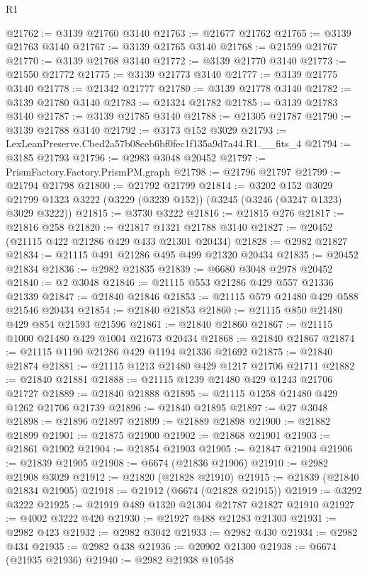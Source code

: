 \begin{lexlean}{R1}
\begin{coremodule}
@21762 := @3139 @21760 @3140
@21763 := @21677 @21762
@21765 := @3139 @21763 @3140
@21767 := @3139 @21765 @3140
@21768 := @21599 @21767
@21770 := @3139 @21768 @3140
@21772 := @3139 @21770 @3140
@21773 := @21550 @21772
@21775 := @3139 @21773 @3140
@21777 := @3139 @21775 @3140
@21778 := @21342 @21777
@21780 := @3139 @21778 @3140
@21782 := @3139 @21780 @3140
@21783 := @21324 @21782
@21785 := @3139 @21783 @3140
@21787 := @3139 @21785 @3140
@21788 := @21305 @21787
@21790 := @3139 @21788 @3140
@21792 := @3173 @152 @3029
@21793 := LexLeanPreserve.Cbed2a57b08ceb6bf0fec1f135a9d7a44.R1.__fits_4
@21794 := @3185 @21793
@21796 := @2983 @3048 @20452
@21797 := PrismFactory.Factory.PrismPM.graph
@21798 := @21796 @21797
@21799 := @21794 @21798
@21800 := @21792 @21799
@21814 := @3202
    @152
    @3029
    @21799
    @1323
    @3222
    (@3229 (@3239 @152))
    (@3245 (@3246 (@3247 @1323) @3029 @3222))
@21815 := @3730 @3222
@21816 := @21815 @276
@21817 := @21816 @258
@21820 := @21817 @1321 @21788 @3140
@21827 := @20452 (@21115 @422 @21286 @429 @433 @21301 @20434)
@21828 := @2982 @21827
@21834 := @21115 @491 @21286 @495 @499 @21320 @20434
@21835 := @20452 @21834
@21836 := @2982 @21835
@21839 := @6680 @3048 @2978 @20452
@21840 := @2 @3048
@21846 := @21115 @553 @21286 @429 @557 @21336 @21339
@21847 := @21840 @21846
@21853 := @21115 @579 @21480 @429 @588 @21546 @20434
@21854 := @21840 @21853
@21860 := @21115 @850 @21480 @429 @854 @21593 @21596
@21861 := @21840 @21860
@21867 := @21115 @1000 @21480 @429 @1004 @21673 @20434
@21868 := @21840 @21867
@21874 := @21115 @1190 @21286 @429 @1194 @21336 @21692
@21875 := @21840 @21874
@21881 := @21115 @1213 @21480 @429 @1217 @21706 @21711
@21882 := @21840 @21881
@21888 := @21115 @1239 @21480 @429 @1243 @21706 @21727
@21889 := @21840 @21888
@21895 := @21115 @1258 @21480 @429 @1262 @21706 @21739
@21896 := @21840 @21895
@21897 := @27 @3048
@21898 := @21896 @21897
@21899 := @21889 @21898
@21900 := @21882 @21899
@21901 := @21875 @21900
@21902 := @21868 @21901
@21903 := @21861 @21902
@21904 := @21854 @21903
@21905 := @21847 @21904
@21906 := @21839 @21905
@21908 := @6674 (@21836 @21906)
@21910 := @2982 @21908 @3029
@21912 := @21820 (@21828 @21910)
@21915 := @21839 (@21840 @21834 @21905)
@21918 := @21912 (@6674 (@21828 @21915))
@21919 := @3292 @3222
@21925 := @21919 @489 @1320 @21304 @21787 @21827 @21910
@21927 := @4002 @3222 @420
@21930 := @21927 @488 @21283 @21303
@21931 := @2982 @423
@21932 := @2982 @3042
@21933 := @2982 @430
@21934 := @2982 @434
@21935 := @2982 @438
@21936 := @20902 @21300
@21938 := @6674 (@21935 @21936)
@21940 := @2982 @21938 @10548

\end{coremodule}
\end{lexlean}

